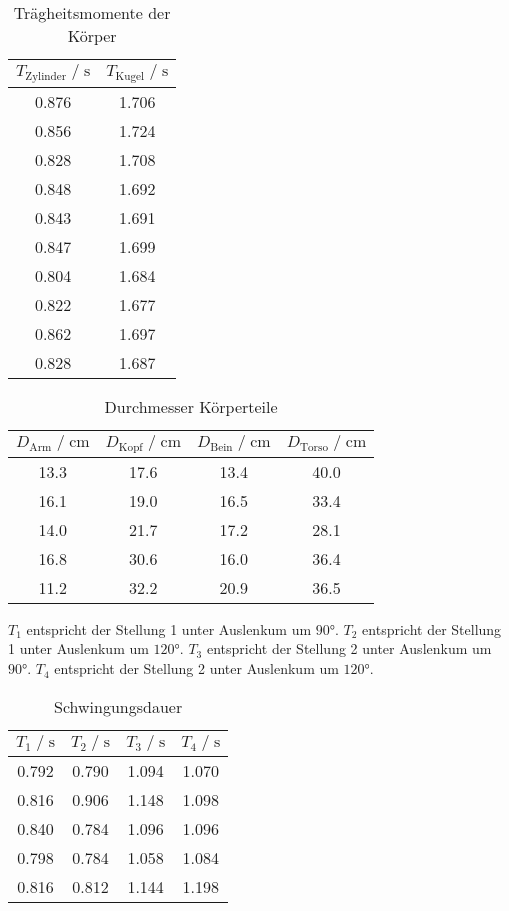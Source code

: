 \begin{table}
    \centering
     \caption{Trägheitsmomente der Körper}
     \label{tab:traegheitsmomente}
     \begin{tabular}{c c}
        \toprule
        $ T_{\text{Zylinder}} \;/\; \si{\second}$ & $ T_{\text{Kugel}} \;/\; \si{\second}$ \\
        \midrule
        0.876 & 1.706 \\
        0.856 & 1.724 \\
        0.828 & 1.708 \\
        0.848 & 1.692 \\
        0.843 & 1.691 \\
        0.847 & 1.699 \\
        0.804 & 1.684 \\
        0.822 & 1.677 \\
        0.862 & 1.697 \\
        0.828 & 1.687 \\
        \bottomrule
     \end{tabular}
 \end{table}

\begin{table}
\centering
    \caption{Durchmesser Körperteile}
    \label{tab:durchmesser}
    \begin{tabular}{c c c c}
    \toprule
    $D_\text{Arm} \;/\; \si{\centi\meter}$ & $D_\text{Kopf} \;/\; \si{\centi\meter}$ & $D_\text{Bein} \;/\; \si{\centi\meter}$ & $D_\text{Torso} \;/\; \si{\centi\meter}$ \\
    \midrule
    13.3 & 17.6 & 13.4 & 40.0 \\
    16.1 & 19.0 & 16.5 & 33.4 \\
    14.0 & 21.7 & 17.2 & 28.1 \\
    16.8 & 30.6 & 16.0 & 36.4 \\
    11.2 & 32.2 & 20.9 & 36.5 \\
    \bottomrule
    \end{tabular}
\end{table}

$T_1$ entspricht der Stellung 1 unter Auslenkum um $90°$.
$T_2$ entspricht der Stellung 1 unter Auslenkum um $120°$.
$T_3$ entspricht der Stellung 2 unter Auslenkum um $90°$.
$T_4$ entspricht der Stellung 2 unter Auslenkum um $120°$.

\begin{table}
    \centering
        \caption{Schwingungsdauer}
        \label{tab:schwingdauer}
        \begin{tabular}{c c c c}
        \toprule
        $T_1 \;/\; \si{\second}$ & $T_2 \;/\; \si{\second}$ & $T_3 \;/\; \si{\second}$ & $T_4 \;/\; \si{\second}$ \\
        \midrule
        0.792 & 0.790 & 1.094 & 1.070 \\
        0.816 & 0.906 & 1.148 & 1.098 \\
        0.840 & 0.784 & 1.096 & 1.096 \\
        0.798 & 0.784 & 1.058 & 1.084 \\
        0.816 & 0.812 & 1.144 & 1.198 \\
        \bottomrule
    \end{tabular}
\end{table}